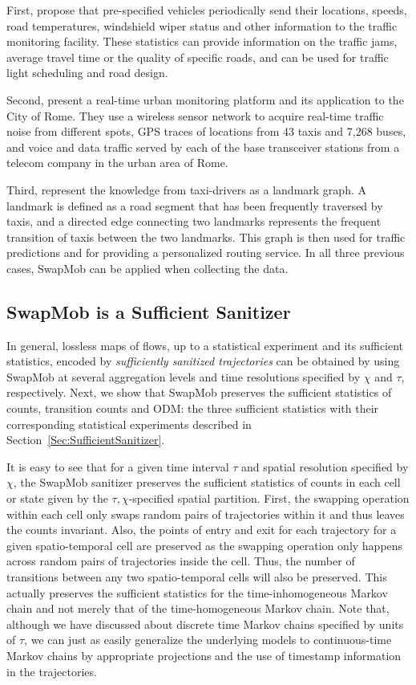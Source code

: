 \documentclass[times,twocolumn,final,authoryear]{elsarticle}
\begin{document}
First,
\cite{Hoh2005} propose that pre-specified vehicles periodically send their locations, speeds, road temperatures, windshield wiper status and other information to the traffic monitoring facility. These statistics can provide information on the traffic jams, average travel time or the quality of specific roads, and can be used for traffic light scheduling and road design.

{\color{blue}
Second, \cite{Calabrese2011} present a real-time urban monitoring platform and its application to the City of Rome. } They use a wireless sensor network to acquire real-time traffic noise from different spots, GPS traces of locations from 43 taxis and 7,268 buses, and voice and data traffic served by each of the base transceiver stations from a telecom company in the urban area of Rome. 


Third, \cite{Yuan2011} represent the knowledge from taxi-drivers as a landmark graph. 
A landmark is defined as a road segment that has been frequently traversed by taxis, and a directed edge connecting two landmarks represents the frequent transition of taxis between the two landmarks. This graph is then used for traffic predictions and for providing a personalized routing service.
{\color{blue}In all three previous cases, SwapMob can be applied when collecting the data.}
\subsection{SwapMob is a Sufficient Sanitizer}\label{sec:sufficient}

In general, lossless maps of flows, up to a statistical experiment and its sufficient statistics, encoded by {\em sufficiently sanitized trajectories} can be obtained by using SwapMob at several aggregation levels and time resolutions specified by $\chi$ and $\tau$, respectively.  
Next, we show that SwapMob preserves the sufficient statistics of counts, transition counts and ODM: the three sufficient statistics with their corresponding statistical experiments described in Section~\ref{Sec:SufficientSanitizer}.

It is easy to see that for a given time interval $\tau$ and spatial resolution specified by $\chi$, the SwapMob sanitizer preserves the sufficient statistics of counts in each cell or state given by the $\tau,\chi$-specified spatial partition.  
First, the swapping operation within each cell only swaps random pairs of trajectories within it and thus leaves the counts invariant.  
Also, the points of entry and exit for each trajectory for a given spatio-temporal cell are preserved as the swapping operation only happens across random pairs of trajectories inside the cell.  
Thus, the number of transitions between any two spatio-temporal cells will also be preserved.  
This actually preserves the sufficient statistics for the time-inhomogeneous Markov chain and not merely that of the time-homogeneous Markov chain. 
Note that, although we have discussed about discrete time Markov chains specified by units of $\tau$, we can just as easily generalize the underlying models to continuous-time Markov chains by appropriate projections and the use of timestamp information in the trajectories.   
\end{document}
